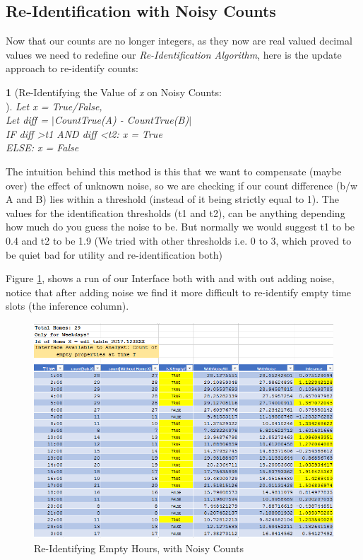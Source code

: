 \documentclass[12pt]{report}
\theoremstyle{named}
\newtheorem*{namedtheorem}{}
\begin{document}
\subsection{Re-Identification with Noisy Counts}
Now that our counts are no longer integers, as they now are real valued decimal values we need to redefine our \textit{Re-Identification Algorithm}, here is the update approach to re-identify counts:



\begin{namedtheorem}[Re-Identifying the Value of \textit{x} on Noisy Counts:\\] 

Let x = True/False,\\ 
Let diff = $\vert$CountTrue(A) - CountTrue(B)$\vert$ \\
IF diff \textgreater t1 AND diff \textless t2: x = True\\ELSE: x = False

\end{namedtheorem}

The intuition behind this method is this that we want to compensate (maybe over) the effect of unknown noise, so we are checking if our count difference (b/w A and B) lies within a threshold (instead of it being strictly equal to 1). The values for the identification thresholds (t1 and t2), can be anything depending how much do you guess the noise to be. But normally we would suggest t1 to be 0.4 and t2 to be 1.9 (We tried with other thresholds i.e. 0 to 3, which proved to be quiet bad for utility and re-identification both)

Figure \ref{fig:NoisyCountReID}, shows a run of our Interface both with and with out adding noise, notice that after adding noise we find it more difficult to re-identify empty time slots (the inference column).

\begin{figure}[ht]
\centering
        \includegraphics[width=150mm,scale=1]{Images/NoisyCountReID.PNG}
    \caption{Re-Identifying Empty Hours, with Noisy Counts}
    \label{fig:NoisyCountReID}
\end{figure}
\end{document}
